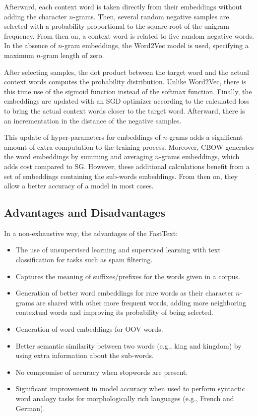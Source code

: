 Afterward, each context word is taken directly from their embeddings without
adding the character $n$-grams. Then, several random negative samples are selected
with a probability proportional to the square root of the unigram
frequency. From then on, a context word is related to five random negative
words. In the absence of $n$-gram embeddings, the Word2Vec model is used,
specifying a maximum $n$-gram length of zero.

After selecting samples, the dot product between the target word and the actual
context words computes the probability distribution. Unlike Word2Vec, there is
this time use of the sigmoid function instead of the softmax function. Finally,
the embeddings are updated with an SGD optimizer according to the calculated
loss to bring the actual context words closer to the target word. Afterward,
there is an incrementation in the distance of the negative samples.

This update of hyper-parameters for embeddings of $n$-grams adds a significant
amount of extra computation to the training process. Moreover, CBOW generates
the word embeddings by summing and averaging $n$-grams embeddings, which adds cost
compared to SG. However, these additional calculations benefit from a set of
embeddings containing the sub-words embeddings. From then on, they allow a
better accuracy of a model in most cases.

\subsection{Advantages and Disadvantages}
\label{subsec:fasttext:pro:cons}

In a non-exhaustive way, the advantages of the FastText:
\begin{multicols}{2}
\begin{itemize}
\item The use of unsupervised learning and supervised learning with text
classification for tasks such as spam filtering.
\item Captures the meaning of suffixes/prefixes for the words given in a corpus.
\item Generation of better word embeddings for rare words as their character
$n$-grams are shared with other more frequent words, adding more neighboring
contextual words and improving its probability of being selected.
\columnbreak
  \item Generation of word embeddings for OOV words.
\item Better semantic similarity between two words (e.g., king and kingdom) by
using extra information about the sub-words.
\item No compromise of accuracy when stopwords are present.
\item Significant improvement in model accuracy when used to perform syntactic
word analogy tasks for morphologically rich languages (e.g., French and German).
\end{itemize}
\end{multicols}

